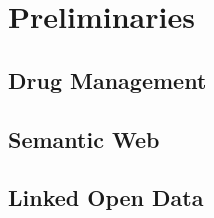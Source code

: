 \chapter{Preliminaries}
\label{cha:prelims}

\section{Drug Management}
\label{sec:drug-management}

\section{Semantic Web}
\label{sec:semantic-web}

\section{Linked Open Data}
\label{sec:linked-open-data}

